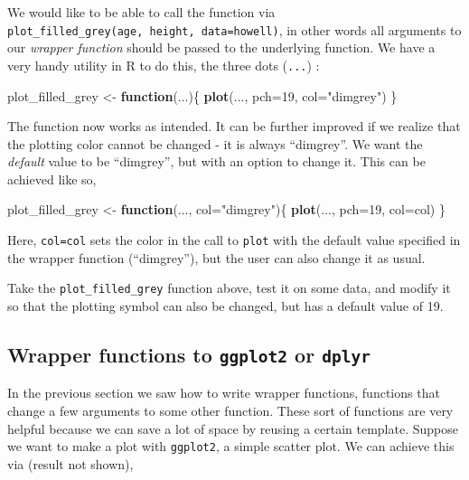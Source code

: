\documentclass[]{book}
\newenvironment{Shaded}{\begin{snugshade}}{\end{snugshade}}
\newcommand{\ControlFlowTok}[1]{\textcolor[rgb]{0.13,0.29,0.53}{\textbf{#1}}}
\newcommand{\DataTypeTok}[1]{\textcolor[rgb]{0.13,0.29,0.53}{#1}}
\newcommand{\DecValTok}[1]{\textcolor[rgb]{0.00,0.00,0.81}{#1}}
\newcommand{\KeywordTok}[1]{\textcolor[rgb]{0.13,0.29,0.53}{\textbf{#1}}}
\newcommand{\NormalTok}[1]{#1}
\newcommand{\StringTok}[1]{\textcolor[rgb]{0.31,0.60,0.02}{#1}}
\let\BeginKnitrBlock\begin \let\EndKnitrBlock\end
\begin{document}
We would like to be able to call the function via \texttt{plot\_filled\_grey(age,\ height,\ data=howell)}, in other words all arguments to our \emph{wrapper function} should be passed to the underlying function. We have a very handy utility in R to do this, the three dots (\texttt{...}) :

\begin{Shaded}
\begin{Highlighting}[]
\NormalTok{plot_filled_grey <-}\StringTok{ }\ControlFlowTok{function}\NormalTok{(...)\{}
  \KeywordTok{plot}\NormalTok{(..., }\DataTypeTok{pch=}\DecValTok{19}\NormalTok{, }\DataTypeTok{col=}\StringTok{"dimgrey"}\NormalTok{)}
\NormalTok{\}}
\end{Highlighting}
\end{Shaded}

The function now works as intended. It can be further improved if we realize that the plotting color cannot be changed - it is always ``dimgrey''. We want the \emph{default} value to be ``dimgrey'', but with an option to change it. This can be achieved like so,

\begin{Shaded}
\begin{Highlighting}[]
\NormalTok{plot_filled_grey <-}\StringTok{ }\ControlFlowTok{function}\NormalTok{(..., }\DataTypeTok{col=}\StringTok{"dimgrey"}\NormalTok{)\{}
  \KeywordTok{plot}\NormalTok{(..., }\DataTypeTok{pch=}\DecValTok{19}\NormalTok{, }\DataTypeTok{col=}\NormalTok{col)}
\NormalTok{\}}
\end{Highlighting}
\end{Shaded}

Here, \texttt{col=col} sets the color in the call to \texttt{plot} with the default value specified in the wrapper function (``dimgrey''), but the user can also change it as usual.

\BeginKnitrBlock{rmdtry}
Take the \texttt{plot\_filled\_grey} function above, test it on some data, and modify it so that the plotting symbol can also be changed, but has a default value of 19.
\EndKnitrBlock{rmdtry}

\hypertarget{wrapper-functions-to-ggplot2-or-dplyr}{%
\subsection{\texorpdfstring{Wrapper functions to \texttt{ggplot2} or \texttt{dplyr}}{Wrapper functions to ggplot2 or dplyr}}\label{wrapper-functions-to-ggplot2-or-dplyr}}

In the previous section we saw how to write wrapper functions, functions that change a few arguments to some other function. These sort of functions are very helpful because we can save a lot of space by reusing a certain template. Suppose we want to make a plot with \texttt{ggplot2}, a simple scatter plot. We can achieve this via (result not shown),
\end{document}

